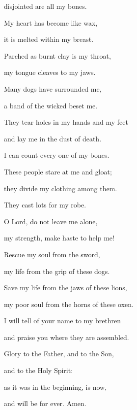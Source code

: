 disjointed are all my bones.

\noindent My heart has become like wax,~\GreStar{}~\nopagebreak

it is melted within my breast.

\noindent Parched as burnt clay is my throat,~\GreStar{}~\nopagebreak

my tongue cleaves to my jaws.

\noindent Many dogs have surrounded me,~\GreStar{}~\nopagebreak

a band of the wicked beset me.

\noindent They tear holes in my hands and my feet~\GreStar{}~\nopagebreak

and lay me in the dust of death.

\noindent I can count every one of my bones.~\GreStar{}~\nopagebreak

These people stare at me and gloat; 

\noindent they divide my clothing among them.~\GreStar{}~\nopagebreak

They cast lots for my robe.

\noindent O Lord, do not leave me alone,~\GreStar{}~\nopagebreak

my strength, make haste to help me!

\noindent Rescue my soul from the sword,~\GreStar{}~\nopagebreak

my life from the grip of these dogs.

\noindent Save my life from the jaws of these lions,~\GreStar{}~\nopagebreak

my poor soul from the horns of these oxen.

\noindent I will tell of your name to my brethren~\GreStar{}~\nopagebreak

and praise you where they are assembled.

\noindent Glory to the Father, and to the Son,~\GreStar{}~\nopagebreak

and to the Holy Spirit:

\noindent as it was in the beginning, is now,~\GreStar{}~\nopagebreak

and will be for ever. Amen.
